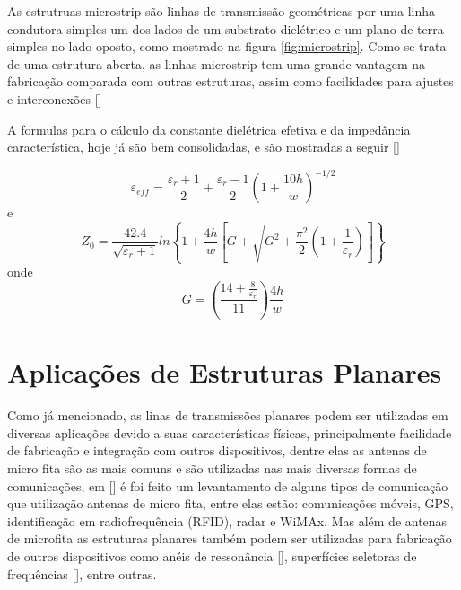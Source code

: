 As estrutruas microstrip são  linhas de transmissão geométricas por uma linha condutora simples um dos lados de um substrato dielétrico e um plano de terra simples no lado oposto, como mostrado na figura \ref{fig:microstrip}. Como se trata de uma estrutura aberta, as linhas microstrip tem uma grande vantagem na fabricação comparada com outras estruturas, assim como facilidades para ajustes e interconexões [\cite{Leo}]


A formulas para o cálculo da constante dielétrica efetiva e da impedância característica, hoje já são bem consolidadas, e são mostradas a seguir [\cite{Bhartia}]

\begin{equation}
\varepsilon_{eff} = \frac{\varepsilon_r +1}{2} + \frac{\varepsilon_r -1}{2}\left(1 + \frac{10h}{w}\right)^{-1/2}
\end{equation}
e
\begin{equation}
Z_0 = \frac{42.4}{\sqrt{\varepsilon_r + 1}} ln\left\lbrace 1 + \frac{4h}{w} \left[  G + \sqrt{ G^2 + \frac{\pi^2}{2} \left(  1 + \frac{1}{\varepsilon_r}\right)}\right] \right\rbrace
\end{equation}
onde
\begin{equation}
G =  \left(\frac{14 + \frac{8}{\varepsilon_r}}{11}\right)\frac{4h}{w} 
\end{equation}

\section{Aplicações de Estruturas Planares}

Como já mencionado, as linas de transmissões planares podem ser utilizadas em diversas aplicações devido a suas características físicas, principalmente facilidade de fabricação e integração com outros dispositivos, dentre elas as antenas de micro fita são as mais comuns e são utilizadas nas mais diversas formas de comunicações, em [\cite{Patel}] é foi feito um levantamento de alguns tipos de comunicação que utilização antenas de micro fita, entre elas estão: comunicações móveis, GPS, identificação em radiofrequência (RFID), radar e WiMAx. Mas além de antenas de microfita as estruturas planares também podem ser utilizadas para fabricação de outros dispositivos como anéis de ressonância [\cite{Benjamin}], superfícies seletoras de frequências [\cite{Mauricio}], entre outras.

